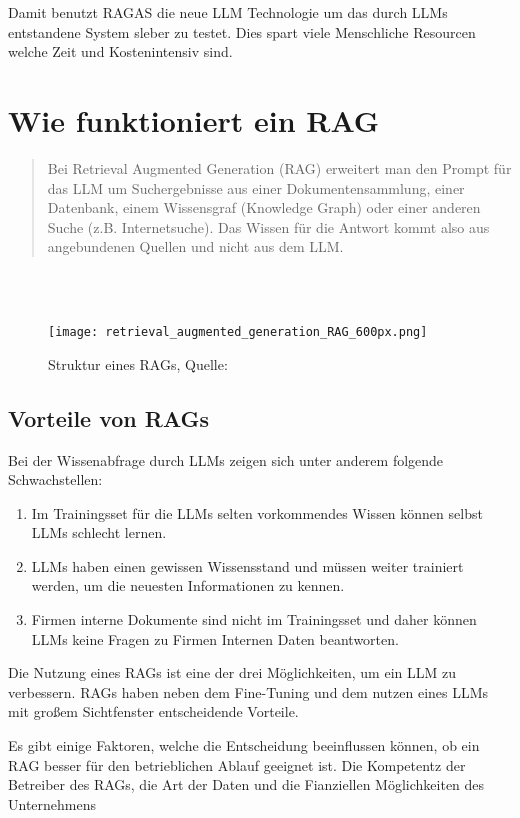 Damit benutzt RAGAS die neue LLM Technologie um das durch LLMs entstandene System sleber zu testet. Dies spart viele Menschliche Resourcen welche Zeit und Kostenintensiv sind.

\section{Wie funktioniert ein RAG}

\begin{quote}
    Bei Retrieval Augmented Generation (RAG) erweitert man den Prompt für das LLM um Suchergebnisse aus einer Dokumentensammlung, einer Datenbank, einem Wissensgraf (Knowledge Graph) oder einer anderen Suche (z.B. Internetsuche). Das Wissen für die Antwort kommt also aus angebundenen Quellen und nicht aus dem LLM.
\end{quote}
\cite{honroth2024retrieval}\\ \\

\begin{figure}[h!]
    \centering
    \texttt{[image: retrieval\_augmented\_generation\_RAG\_600px.png]}
    \caption{Struktur eines RAGs, Quelle: \cite{honroth2024retrieval}}
    \label{fig:Rag Structure}
\end{figure}


\subsection{Vorteile von RAGs}
Bei der Wissenabfrage durch LLMs zeigen sich unter anderem folgende Schwachstellen:
\begin{enumerate}
    \item Im Trainingsset für die LLMs selten vorkommendes Wissen können selbst LLMs schlecht lernen. \cite{gao2023rtre} \cite{press2022measuring}  
    \item LLMs haben einen gewissen Wissensstand und müssen weiter trainiert werden, um die neuesten Informationen zu kennen.
    \item Firmen interne Dokumente sind nicht im Trainingsset und daher können LLMs keine Fragen zu Firmen Internen Daten beantworten.
\end{enumerate}

Die Nutzung eines RAGs ist eine der drei Möglichkeiten, um ein LLM zu verbessern.
RAGs haben neben dem Fine-Tuning und dem nutzen eines LLMs mit großem Sichtfenster entscheidende Vorteile.

Es gibt einige Faktoren, welche die Entscheidung beeinflussen können, ob ein RAG besser für den betrieblichen Ablauf geeignet ist.
Die Kompetentz der Betreiber des RAGs, die Art der Daten und die Fianziellen Möglichkeiten des Unternehmens


